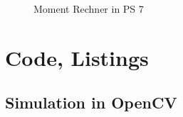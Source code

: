 \documentclass[a4paper]{report}
\begin{document}
\begin{figure}[H]
\centering
{}
\caption{Moment Rechner in PS 7}
\label{fig:Moment Rechner_in_PS_7}
\end{figure}

\newpage 
\section{Code, Listings}

\subsection{Simulation in OpenCV}
\end{document}
